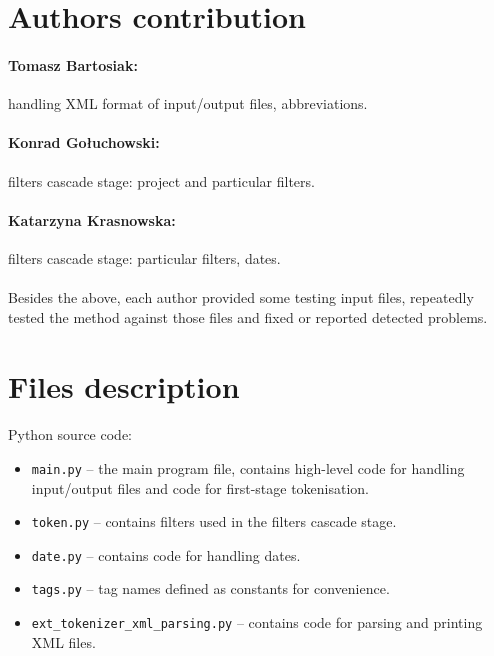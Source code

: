 \documentclass[oneside,12pt]{article}
\begin{document}
\section{Authors contribution}

\paragraph{Tomasz Bartosiak:} handling XML format of input/output files, abbreviations.

\paragraph{Konrad Gołuchowski:} filters cascade stage: project and particular filters.

\paragraph{Katarzyna Krasnowska:} filters cascade stage: particular filters, dates.

\paragraph{}
Besides the above, each author provided some testing input files, repeatedly tested the method against those files and fixed or reported detected problems. 

\section{Files description}

\paragraph{}
Python source code:
\begin{itemize}
    \item \texttt{main.py} -- the main program file, contains high-level code for handling input/output files and code for first-stage tokenisation.
    
    \item \texttt{token.py} -- contains filters used in the filters cascade stage.
    
    \item \texttt{date.py} -- contains code for handling dates.
    
    \item \texttt{tags.py} -- tag names defined as constants for convenience.
    
    \item \texttt{ext\_tokenizer\_xml\_parsing.py} -- contains code for parsing and printing XML files.
\end{itemize}
\end{document}
